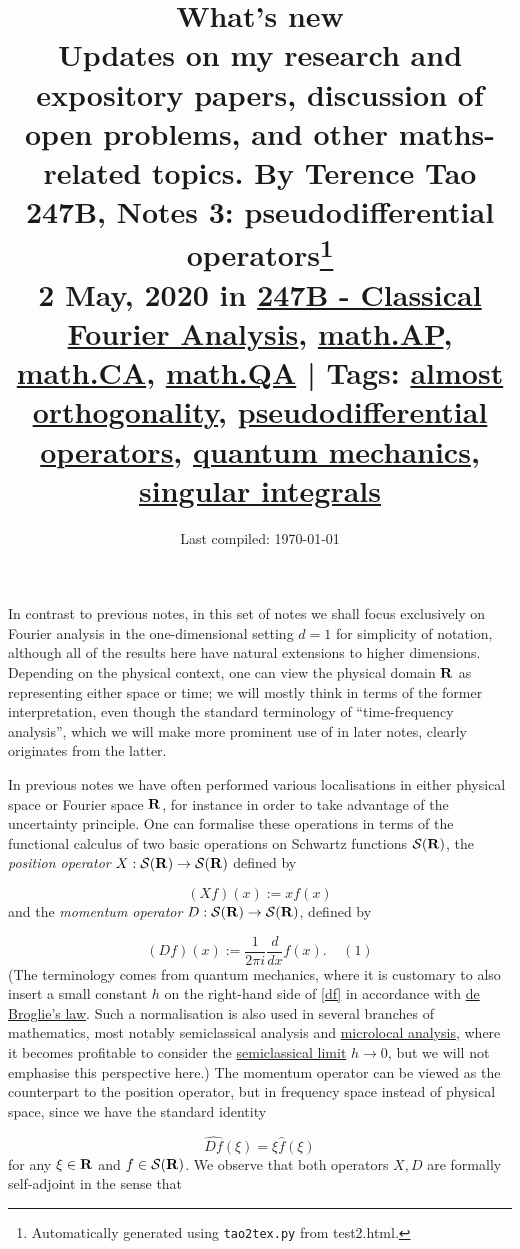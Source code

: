 \documentclass[11pt]{article}
\title{{\normalsize What's new\\Updates on my research and expository papers, discussion of open problems, and other maths-related topics.  By Terence Tao}\\247B, Notes 3: pseudodifferential operators\footnote{Automatically generated using \texttt{tao2tex.py} from test2.html.}\\ \footnotesize 2 May, 2020 in \href{https://terrytao.wordpress.com/category/teaching/247b-classical-fourier-analysis/}{247B - Classical Fourier Analysis}, \href{https://terrytao.wordpress.com/category/mathematics/mathap/}{math.AP}, \href{https://terrytao.wordpress.com/category/mathematics/mathca/}{math.CA}, \href{https://terrytao.wordpress.com/category/mathematics/mathqa/}{math.QA} | Tags: \href{https://terrytao.wordpress.com/tag/almost-orthogonality/}{almost orthogonality}, \href{https://terrytao.wordpress.com/tag/pseudodifferential-operators/}{pseudodifferential operators}, \href{https://terrytao.wordpress.com/tag/quantum-mechanics/}{quantum mechanics}, \href{https://terrytao.wordpress.com/tag/singular-integrals/}{singular integrals} }
\date{Last compiled: \today}
\theoremstyle{definition}
\theoremstyle{remark}
\begin{document}
\maketitle

 In contrast to previous notes, in this set of notes we shall focus exclusively on Fourier analysis in the one-dimensional setting \({d=1}\) for simplicity of notation, although all of the results here have natural extensions to higher dimensions. Depending on the physical context, one can view the physical domain \({{\bf R}}\) as representing either space or time; we will mostly think in terms of the former interpretation, even though the standard terminology of “time-frequency analysis”, which we will make more prominent use of in later notes, clearly originates from the latter.



In previous notes we have often performed various localisations in either physical space or Fourier space \({{\bf R}}\), for instance in order to take advantage of the uncertainty principle. One can formalise these operations in terms of the functional calculus of two basic operations on Schwartz functions \({{\mathcal S}({\bf R})}\), the \emph{position operator} \({X: {\mathcal S}({\bf R}) \rightarrow {\mathcal S}({\bf R})}\) defined by 

\[\displaystyle  (Xf)(x) := x f(x)\]
 and the \emph{momentum operator} \({D: {\mathcal S}({\bf R}) \rightarrow {\mathcal S}({\bf R})}\), defined by \label{df}

\[\displaystyle  (Df)(x) := \frac{1}{2\pi i} \frac{d}{dx} f(x). \ \ \ \ \ (1)\]
 (The terminology comes from quantum mechanics, where it is customary to also insert a small constant \({h}\) on the right-hand side of \eqref{df} in accordance with \href{https://en.wikipedia.org/wiki/Matter_wave}{de Broglie’s law}. Such a normalisation is also used in several branches of mathematics, most notably semiclassical analysis and \href{https://en.wikipedia.org/wiki/Microlocal_analysis}{microlocal analysis}, where it becomes profitable to consider the \href{https://en.wikipedia.org/wiki/Semiclassical_physics}{semiclassical limit} \({h \rightarrow 0}\), but we will not emphasise this perspective here.) The momentum operator can be viewed as the counterpart to the position operator, but in frequency space instead of physical space, since we have the standard identity 

\[\displaystyle  \widehat{Df}(\xi) = \xi \hat f(\xi)\]
 for any \({\xi \in {\bf R}}\) and \({f \in {\mathcal S}({\bf R})}\). We observe that both operators \({X,D}\) are formally self-adjoint in the sense that 
\end{document}
